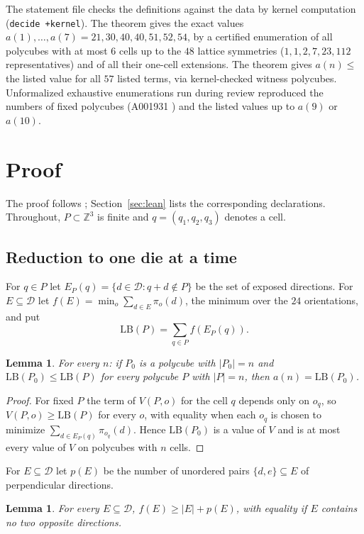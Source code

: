 \documentclass[11pt]{amsart}
\theoremstyle{plain}
\newtheorem{lemma}[theorem]{Lemma}
\theoremstyle{definition}
\newcommand{\Z}{\mathbb{Z}}
\newcommand{\D}{\mathcal{D}}
\newcommand{\LB}{\mathrm{LB}}
\begin{document}
The statement file checks the definitions against the data by kernel computation (\texttt{decide +kernel}). The theorem  gives the exact values $a(1),\dots,a(7)=21,30,40,40,51,52,54$, by a certified enumeration of all polycubes with at most $6$ cells up to the $48$ lattice symmetries ($1,1,2,7,23,112$ representatives) and of all their one-cell extensions. The theorem  gives $a(n)\le$ the listed value for all $57$ listed terms, via kernel-checked witness polycubes. Unformalized exhaustive enumerations run during review reproduced the numbers of fixed polycubes (A001931 \cite{A001931}) and the listed values up to $a(9)$ or $a(10)$.

\section{Proof}\label{sec:proof}

The proof follows ; Section~\ref{sec:lean} lists the corresponding declarations. Throughout, $P\subset\Z^3$ is finite and $q=(q_1,q_2,q_3)$ denotes a cell.

\subsection{Reduction to one die at a time}
For $q\in P$ let $E_P(q)=\{d\in\D: q+d\notin P\}$ be the set of exposed directions. For $E\subseteq\D$ let $f(E)=\min_o\sum_{d\in E}\pi_o(d)$, the minimum over the $24$ orientations, and put
\[
\LB(P)=\sum_{q\in P}f(E_P(q)).
\]

\begin{lemma}\label{lem:reduce}
For every $n$: if $P_0$ is a polycube with $|P_0|=n$ and $\LB(P_0)\le\LB(P)$ for every polycube $P$ with $|P|=n$, then $a(n)=\LB(P_0)$.
\end{lemma}

\begin{proof}
For fixed $P$ the term of $V(P,o)$ for the cell $q$ depends only on $o_q$, so $V(P,o)\ge\LB(P)$ for every $o$, with equality when each $o_q$ is chosen to minimize $\sum_{d\in E_P(q)}\pi_{o_q}(d)$. Hence $\LB(P_0)$ is a value of $V$ and is at most every value of $V$ on polycubes with $n$ cells.
\end{proof}

For $E\subseteq\D$ let $p(E)$ be the number of unordered pairs $\{d,e\}\subseteq E$ of perpendicular directions.

\begin{lemma}\label{lem:die}
For every $E\subseteq\D$, $f(E)\ge|E|+p(E)$, with equality if $E$ contains no two opposite directions.
\end{lemma}
\end{document}

